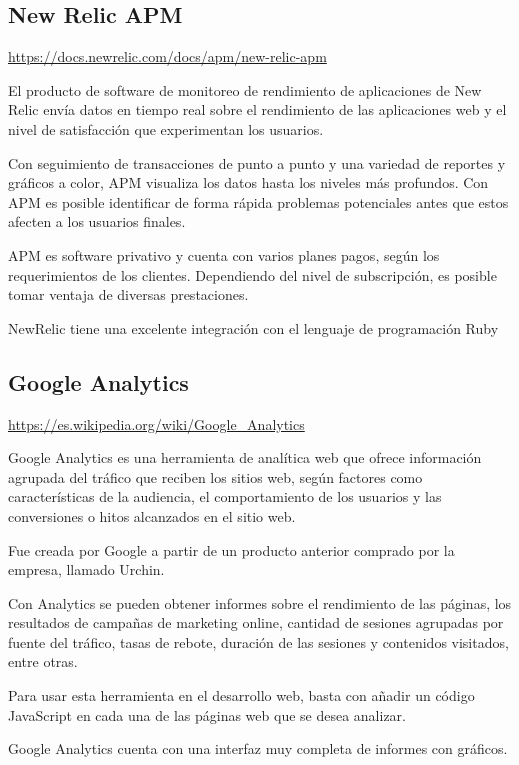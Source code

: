 \subsection{New Relic APM}

\url{https://docs.newrelic.com/docs/apm/new-relic-apm}

El producto de software de monitoreo de rendimiento de aplicaciones de New Relic envía datos en tiempo real sobre el rendimiento de las aplicaciones web y el nivel de satisfacción que experimentan los usuarios.

Con seguimiento de transacciones de punto a punto y una variedad de reportes y gráficos a color, APM visualiza los datos hasta los niveles más profundos. Con APM es posible identificar de forma rápida problemas potenciales antes que estos afecten a los usuarios finales.



APM es software privativo y cuenta con varios planes pagos, según los requerimientos de los clientes. Dependiendo del nivel de subscripción, es posible tomar ventaja de diversas prestaciones.

NewRelic tiene una excelente integración con el lenguaje de programación Ruby


\subsection{Google Analytics}

\url{https://es.wikipedia.org/wiki/Google_Analytics}

Google Analytics es una herramienta de analítica web que ofrece información agrupada del tráfico que reciben los sitios web, según factores como características de la audiencia, el comportamiento de los usuarios y las conversiones o hitos alcanzados en el sitio web.

Fue creada por Google a partir de un producto anterior comprado por la empresa, llamado Urchin. 

Con Analytics se pueden obtener informes sobre el rendimiento de las páginas, los resultados de campañas de marketing online, cantidad de sesiones agrupadas por fuente del tráfico, tasas de rebote, duración de las sesiones y contenidos visitados, entre otras.

Para usar esta herramienta en el desarrollo web, basta con añadir un código JavaScript en cada una de las páginas web que se desea analizar.


Google Analytics cuenta con una interfaz muy completa de informes con gráficos.


